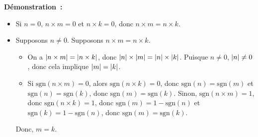 \noindent\textbf{Démonstration :} 
    \begin{itemize}[nosep]
        \item Si $n = 0$, $n \times m = 0$ et $n \times k = 0$, donc $n \times m = n \times k$.
        \item Supposons $n \neq 0$. 
            Supposons $n \times m = n \times k$.
            \begin{itemize}[nosep]
                \item On a $\left\lvert n \times m \right\rvert = \left\lvert n \times k \right\rvert$, donc $\left\lvert n \right\rvert \times \left\lvert m \right\rvert = \left\lvert n \right\rvert \times \left\lvert k \right\rvert$. 
                    Puisque $n \neq 0$, $\left\lvert n \right\rvert \neq 0$, donc cela implique $\left\lvert m \right\rvert = \left\lvert k \right\rvert$.
                \item Si $\mathrm{sgn}(n \times m) = 0$, alors $\mathrm{sgn}(n \times k) = 0$, donc $\mathrm{sgn}(n) = \mathrm{sgn}(m)$ et $\mathrm{sgn}(n) = \mathrm{sgn}(k)$, donc $\mathrm{sgn}(m) = \mathrm{sgn}(k)$.
                    Sinon, $\mathrm{sgn}(n \times m) = 1$, donc $\mathrm{sgn}(n \times k) = 1$, donc $\mathrm{sgn}(m) = 1 - \mathrm{sgn}(n)$ et $\mathrm{sgn}(k) = 1 - \mathrm{sgn}(n)$, donc $\mathrm{sgn}(m) = \mathrm{sgn}(k)$.
            \end{itemize}
            Donc, $m = k$.
            

\end{itemize}
